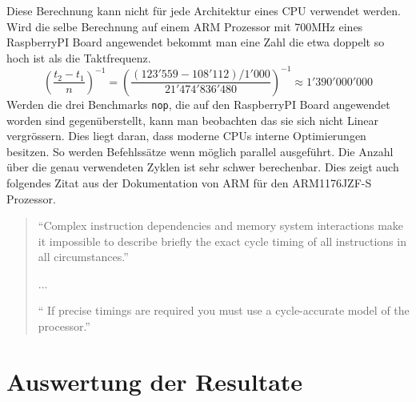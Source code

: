 Diese Berechnung kann nicht für jede Architektur eines CPU verwendet werden. Wird die selbe Berechnung auf einem ARM Prozessor mit 700MHz eines RaspberryPI Board angewendet bekommt man eine Zahl die etwa doppelt so hoch ist als die Taktfrequenz.
\[ \left(\frac{t_2-t_1}{n}\right)^{-1} =  \left(\frac{(123'559-108'112)/1'000}{21'474'836'480}\right)^{-1} \approx 1'390'000'000 \]
Werden die drei Benchmarks \texttt{nop}, die auf den RaspberryPI Board angewendet worden sind gegenüberstellt, kann man beobachten das sie sich nicht Linear vergrössern. Dies liegt daran, dass moderne CPUs interne Optimierungen besitzen. So werden Befehlssätze wenn möglich parallel ausgeführt. Die Anzahl über die genau verwendeten Zyklen ist sehr schwer berechenbar. Dies zeigt auch folgendes Zitat aus der Dokumentation von ARM für den ARM1176JZF-S Prozessor.

\begin{quotation}
\enquote{Complex instruction dependencies and memory system interactions make it impossible to
describe briefly the exact cycle timing of all instructions in all circumstances.}
\par
...
\par
\enquote{ If precise timings are required you must use a cycle-accurate model of the processor.\cite{arm_datasheet}}
\end{quotation}



\section{Auswertung der Resultate}
\label{sec:auswertung_resultate}

